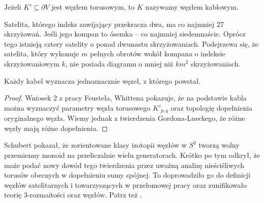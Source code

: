\begin{definition}
	Jeżeli $K' \subseteq \partial V$ jest węzłem torusowym,	to $K$ nazywamy węzłem kablowym.
\end{definition}

Satelita, którego indeks zawijający przekracza dwa, ma co najmniej 27 skrzyżowań.
Jeśli jego kompan to ósemka -- co najmniej siedemnaście.
Oprócz tego istnieją cztery satelity o ponad dwunastu skrzyżowaniach.
Podejrzewa się, że satelita, który wykonuje $m$ pełnych obrotów wokół kompana o indeksie skrzyżowaniowym $k$, nie posiada diagramu o mniej niż $km^2$ skrzyżowaniach.

\begin{proposition}
	Każdy kabel wyznacza jednoznacznie węzeł, z którego powstał.
\end{proposition}

\begin{proof}
	Wniosek 2 z pracy \cite{feustel78} Feustela, Whittena pokazuje, że na podstawie kabla można wyznaczyć parametry węzła torusowego $K'_{p,q}$ oraz topologię dopełnienia oryginalnego węzła.
	Wiemy jednak z twierdzenia Gordona-Lueckego, że różne węzły mają różne dopełnienia.
\end{proof}

Schubert pokazał, że zorientowane klasy izotopii węzłów w $S^3$ tworzą wolny przemienny monoid na przeliczalnie wielu generatorach.
Krótko po tym odkrył, że może podać nowy dowód tego twierdzenia przez uważną analizę nieściśliwych torusów obecnych w dopełnieniu sumy spójnej.
To doprowadziło go do definicji węzłów satelitarnych i towarzyszących w przełomowej pracy \cite{schubert53} oraz zunifikowało teorię 3-rozmaitości oraz węzłów.
Patrz też \cite{motegi97}.

